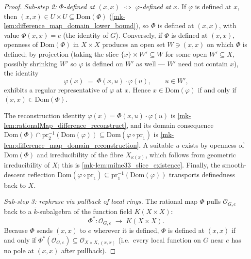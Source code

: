 \begin{proof}
  \emph{Sub-step 2: \(\Phi\)-defined at \((x, x)\) \(\Leftrightarrow\) \(\varphi\)-defined at
  \(x\).} If \(\varphi\) is defined at \(x\), then \((x,x) \in U \times U \subseteq
  \mathrm{Dom}(\Phi)\) (\ref{mk-lem:difference_map_domain_lower_bound}), so \(\Phi\) is
  defined at \((x, x)\), with value \(\Phi(x, x) = e\) (the identity of \(G\)). Conversely, if \(\Phi\) is
  defined at \((x, x)\), openness of \(\mathrm{Dom}(\Phi)\) in \(X \times X\) produces an
  open set \(W \ni (x, x)\) on which \(\Phi\) is defined; by projection (taking the slice
  \(\{x\} \times W' \subseteq W\) for some open \(W' \subseteq X\), possibly shrinking
  \(W'\) so \(\varphi\) is defined on \(W'\) as well --- \(W'\) need not contain \(x\)), the
  identity
  \[
    \varphi(x) \;=\; \Phi(x, u) \cdot \varphi(u),
    \qquad u \in W',
  \]
  exhibits a regular representative of \(\varphi\) at \(x\). Hence \(x \in
  \mathrm{Dom}(\varphi)\) if and only if \((x, x) \in \mathrm{Dom}(\Phi)\).

  The reconstruction identity \(\varphi(x) = \Phi(x,u) \cdot \varphi(u)\) is
  \ref{mk-lem:rationalMap_difference_reconstruct}, and its domain consequence
  \(\mathrm{Dom}(\Phi) \cap \mathrm{pr}_2^{-1}(\mathrm{Dom}(\varphi)) \subseteq
  \mathrm{Dom}(\varphi \circ \mathrm{pr}_1)\) is
  \ref{mk-lem:difference_map_domain_reconstruction}. A suitable \(u\) exists by openness of
  \(\mathrm{Dom}(\Phi)\) and irreducibility of the fibre \(X_{\kappa(x)}\), which follows
  from geometric irreducibility of \(X\); this is
  \ref{mk-lem:milne33_slice_existence}. Finally, the smooth-descent reflection
  \(\mathrm{Dom}(\varphi \circ \mathrm{pr}_1) \subseteq
  \mathrm{pr}_1^{-1}(\mathrm{Dom}(\varphi))\) transports definedness back to \(X\).

  \emph{Sub-step 3: rephrase via pullback of local rings.} The rational map \(\Phi\)
  pulls \(\mathcal O_{G, e}\) back to a \(\bar k\)-subalgebra of the function field
  \(K(X \times X)\):
  \[
    \Phi^\ast \colon \mathcal O_{G, e} \;\longrightarrow\; K(X \times X).
  \]
  Because \(\Phi\) sends \((x, x)\) to \(e\) wherever it is defined, \(\Phi\) is defined at
  \((x, x)\) if and only if \(\Phi^\ast(\mathcal O_{G, e}) \subseteq \mathcal O_{X
  \times X, (x, x)}\) (i.e.\ every local function on \(G\) near \(e\) has no pole at
  \((x, x)\) after pullback).


\end{proof}

